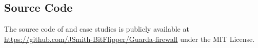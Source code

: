 






\subsection{Source Code}

The source code of \sys{} and case studies is publicly available at \url{https://github.com/JSmith-BitFlipper/Guarda-firewall} under the MIT License.

